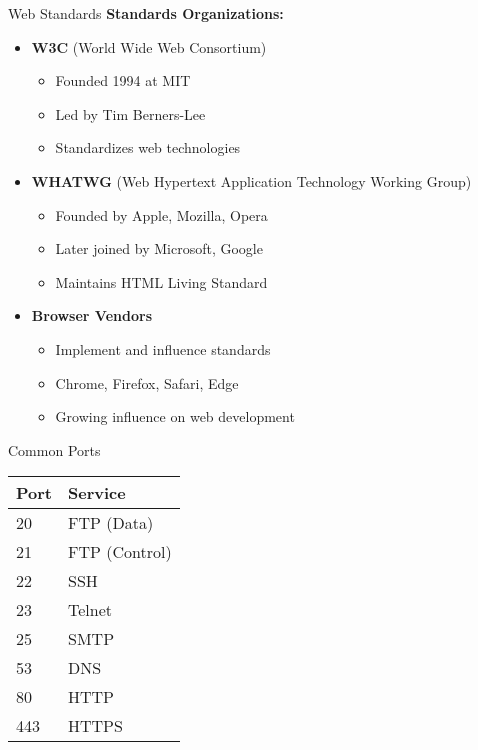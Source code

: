\begin{concept}{Web Standards}
    \textbf{Standards Organizations:}
    \begin{itemize}
        \item \textbf{W3C} (World Wide Web Consortium)
            \begin{itemize}
                \item Founded 1994 at MIT
                \item Led by Tim Berners-Lee
                \item Standardizes web technologies
            \end{itemize}
        \item \textbf{WHATWG} (Web Hypertext Application Technology Working Group)
            \begin{itemize}
                \item Founded by Apple, Mozilla, Opera
                \item Later joined by Microsoft, Google
                \item Maintains HTML Living Standard
            \end{itemize}
        \item \textbf{Browser Vendors}
            \begin{itemize}
                \item Implement and influence standards
                \item Chrome, Firefox, Safari, Edge
                \item Growing influence on web development
            \end{itemize}
    \end{itemize}
\end{concept}

\begin{corollary}{Common Ports}
    \begin{center}
    \begin{tabular}{|l|l|}
        \hline
        \textbf{Port} & \textbf{Service} \\
        \hline
        20 & FTP (Data) \\
        21 & FTP (Control) \\
        22 & SSH \\
        23 & Telnet \\
        25 & SMTP \\
        53 & DNS \\
        80 & HTTP \\
        443 & HTTPS \\
        \hline
    \end{tabular}
    \end{center}
\end{corollary}

